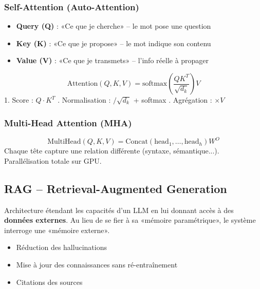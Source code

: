 \documentclass[a4paper,10pt]{article}
\begin{document}
\subsubsection{Self-Attention (Auto-Attention)}

\begin{definitionbox}[{Q, K, V -- Principes}]
\begin{itemize}
  \item \textbf{Query (Q)} : «Ce que je cherche» -- le mot pose une question
  \item \textbf{Key (K)} : «Ce que je propose» -- le mot indique son contenu
  \item \textbf{Value (V)} : «Ce que je transmets» -- l'info réelle à propager
\end{itemize}
\end{definitionbox}

\begin{formulebox}
\[
\text{Attention}(Q, K, V) = \text{softmax}\!\left(\frac{QK^T}{\sqrt{d_k}}\right) V
\]
1. Score : $Q \cdot K^T$ . Normalisation : $/ \sqrt{d_k}$ + softmax . Agrégation : $\times V$
\end{formulebox}

\subsubsection{Multi-Head Attention (MHA)}
\begin{formulebox}[MHA]
\[
\text{MultiHead}(Q, K, V) = \text{Concat}(\text{head}_1, \ldots, \text{head}_h) W^O
\]
Chaque tête capture une relation différente (syntaxe, sémantique...). Parallélisation totale sur GPU.
\end{formulebox}

\subsection{RAG -- Retrieval-Augmented Generation}

\begin{definitionbox}
Architecture étendant les capacités d'un LLM en lui donnant accès à des \textbf{données externes}. Au lieu de se fier à sa «mémoire paramétrique», le système interroge une «mémoire externe».
\begin{itemize}
  \item Réduction des hallucinations
  \item Mise à jour des connaissances sans ré-entraînement
  \item Citations des sources
\end{itemize}
\end{definitionbox}
\end{document}
